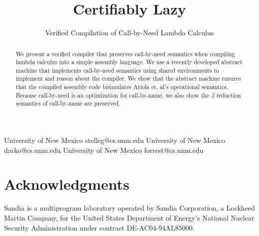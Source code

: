 \documentclass[preprint]{sigplanconf}
\begin{document}
\copyrightdata{[to be supplied]} 


\title{Certifiably Lazy}
\subtitle{Verified Compilation of Call-by-Need Lambda Calculus}

           {University of New Mexico}
           {stelleg@cs.unm.edu}
           {University of New Mexico}
           {darko@cs.unm.edu}
           {University of New Mexico}
           {forrest@cs.unm.edu}

\maketitle

\begin{abstract}
We present a verified compiler that preserves call-by-need semantics when
compiling lambda calculus into a simple assembly language. We use a recently
developed abstract machine that implements call-by-need semantics using shared
environments to implement and reason about the compiler. We show that the
abstract machine ensures that the compiled assembly code bisimulates Ariola et.
al's operational semantics. Because call-by-need is an optimization for
call-by-name, we also show the $\beta$ reduction semantics of call-by-name are
preserved.
\end{abstract}










\section{Acknowledgments}
Sandia is a multiprogram laboratory operated by Sandia Corporation, a Lockheed Martin Company, for the United States Department of Energy’s National Nuclear Security Administration under contract DE-AC04-94AL85000.



\end{document}
